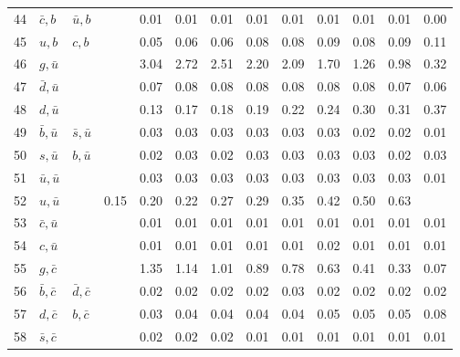 \begin{tabularx}{\textwidth}{rXXX@{}S@{}S@{}S@{}S@{}S@{}S@{}S@{}S@{}S}
 44 & $\bar c, b$      & $\bar u, b$       &                  &  0.01 &  0.01 &  0.01 &  0.01 &  0.01 &  0.01 &  0.01 &  0.01 &  0.00 \\
 45 & $u, b$           & $c, b$            &                  &  0.05 &  0.06 &  0.06 &  0.08 &  0.08 &  0.09 &  0.08 &  0.09 &  0.11 \\
 46 & $g, \bar u$      &                   &                  &  3.04 &  2.72 &  2.51 &  2.20 &  2.09 &  1.70 &  1.26 &  0.98 &  0.32 \\
 47 & $\bar d, \bar u$ &                   &                  &  0.07 &  0.08 &  0.08 &  0.08 &  0.08 &  0.08 &  0.08 &  0.07 &  0.06 \\
 48 & $d, \bar u$      &                   &                  &  0.13 &  0.17 &  0.18 &  0.19 &  0.22 &  0.24 &  0.30 &  0.31 &  0.37 \\
 49 & $\bar b, \bar u$ & $\bar s, \bar u$  &                  &  0.03 &  0.03 &  0.03 &  0.03 &  0.03 &  0.03 &  0.02 &  0.02 &  0.01 \\
 50 & $s, \bar u$      & $b, \bar u$       &                  &  0.02 &  0.03 &  0.02 &  0.03 &  0.03 &  0.03 &  0.03 &  0.02 &  0.03 \\
 51 & $\bar u, \bar u$ &                   &                  &  0.03 &  0.03 &  0.03 &  0.03 &  0.03 &  0.03 &  0.03 &  0.03 &  0.01 \\
 52 & $u, \bar u$                          &                  &  0.15 &  0.20 &  0.22 &  0.27 &  0.29 &  0.35 &  0.42 &  0.50 &  0.63 \\
 53 & $\bar c, \bar u$ &                   &                  &  0.01 &  0.01 &  0.01 &  0.01 &  0.01 &  0.01 &  0.01 &  0.01 &  0.01 \\
 54 & $c, \bar u$      &                   &                  &  0.01 &  0.01 &  0.01 &  0.01 &  0.01 &  0.02 &  0.01 &  0.01 &  0.01 \\
 55 & $g, \bar c$      &                   &                  &  1.35 &  1.14 &  1.01 &  0.89 &  0.78 &  0.63 &  0.41 &  0.33 &  0.07 \\
 56 & $\bar b, \bar c$ & $\bar d, \bar c$  &                  &  0.02 &  0.02 &  0.02 &  0.02 &  0.03 &  0.02 &  0.02 &  0.02 &  0.02 \\
 57 & $d, \bar c$      & $b, \bar c$       &                  &  0.03 &  0.04 &  0.04 &  0.04 &  0.04 &  0.05 &  0.05 &  0.05 &  0.08 \\
 58 & $\bar s, \bar c$ &                   &                  &  0.02 &  0.02 &  0.02 &  0.01 &  0.01 &  0.01 &  0.01 &  0.01 &  0.01 \\

\end{tabularx}
